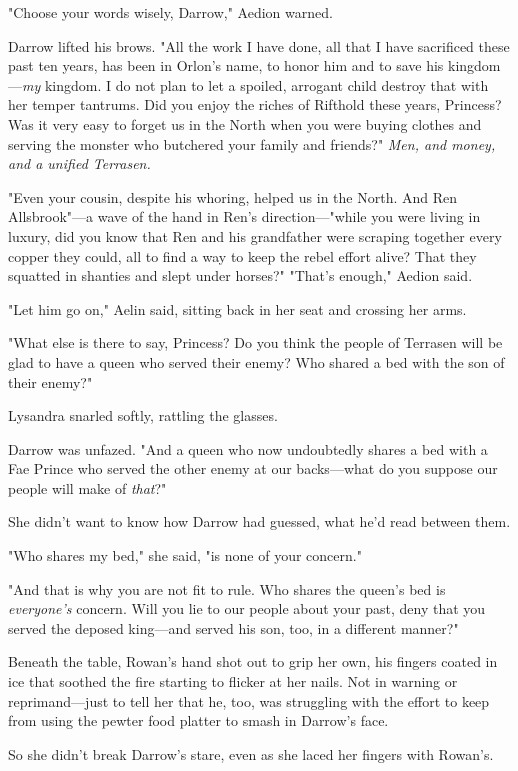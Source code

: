 "Choose your words wisely, Darrow," Aedion warned.

Darrow lifted his brows. 
"All the work I have done, all that I have sacrificed these past ten years, has been in Orlon's name, to honor him and to save his kingdom---\emph{my} kingdom. 
I do not plan to let a spoiled, arrogant child destroy that with her temper tantrums. 
Did you enjoy the riches of Rifthold these years, Princess? 
Was it very easy to forget us in the North when you were buying clothes and serving the monster who butchered your family and friends?" 
\emph{Men, and money, and a unified Terrasen.}

"Even your cousin, despite his whoring, helped us in the North. 
And Ren Allsbrook"---a wave of the hand in Ren's direction---"while you were living in luxury, did you know that Ren and his grandfather were scraping together every copper they could, all to find a way to keep the rebel effort alive? 
That they squatted in shanties and slept under horses?"
"That's enough," Aedion said.

"Let him go on," Aelin said, sitting back in her seat and crossing her arms.

"What else is there to say, Princess? 
Do you think the people of Terrasen will be glad to have a queen who served their enemy? 
Who shared a bed with the son of their enemy?"

Lysandra snarled softly, rattling the glasses.

Darrow was unfazed. 
"And a queen who now undoubtedly shares a bed with a Fae Prince who served the other enemy at our backs---what do you suppose our people will make of \emph{that}?"

She didn't want to know how Darrow had guessed, what he'd read between them.

"Who shares my bed," she said, "is none of your concern."

"And that is why you are not fit to rule. 
Who shares the queen's bed is \emph{everyone's} concern. 
Will you lie to our people about your past, deny that you served the deposed king---and served his son, too, in a different manner?"

Beneath the table, Rowan's hand shot out to grip her own, his fingers coated in ice that soothed the fire starting to flicker at her nails. 
Not in warning or reprimand---just to tell her that he, too, was struggling with the effort to keep from using the pewter food platter to smash in Darrow's face.

So she didn't break Darrow's stare, even as she laced her fingers with Rowan's.

